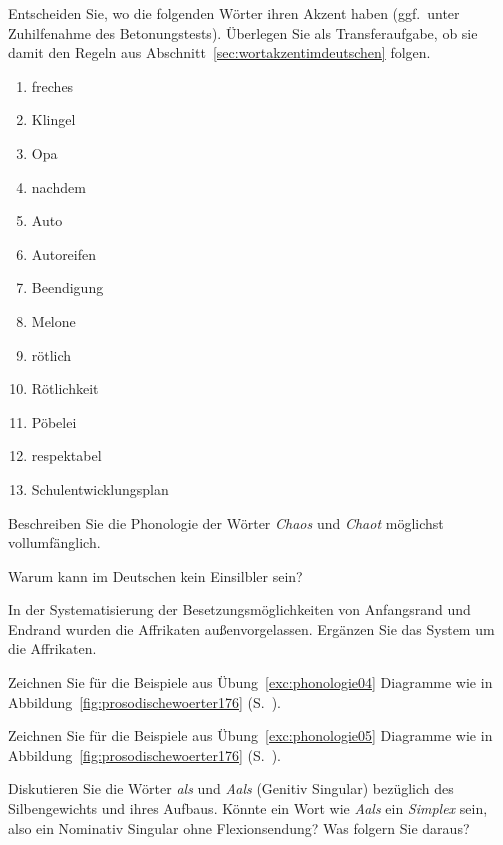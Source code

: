  \label{exc:phonologie05} Entscheiden Sie, wo die folgenden Wörter ihren Akzent haben (ggf.\ unter Zuhilfenahme des Betonungstests).
Überlegen Sie als Transferaufgabe, ob sie damit den Regeln aus Abschnitt~\ref{sec:wortakzentimdeutschen} folgen.

\begin{enumerate}
  \item freches
  \item Klingel
  \item Opa
  \item nachdem
  \item Auto
  \item Autoreifen
  \item Beendigung
  \item Melone
  \item rötlich
  \item Rötlichkeit
  \item Pöbelei
  \item respektabel
  \item Schulentwicklungsplan
\end{enumerate}

\Uebung[\tristar]{} \label{exc:phonologie06} Beschreiben Sie die Phonologie der Wörter \textit{Chaos} und \textit{Chaot} möglichst vollumfänglich.

 \label{exc:phonologie07} Warum kann \textipa{[s5]} im Deutschen kein Einsilbler sein?

\Uebung[\tristar]{} \label{exc:phonologie08} In der Systematisierung der Besetzungsmöglichkeiten von Anfangsrand und Endrand wurden die Affrikaten außenvorgelassen.
Ergänzen Sie das System um die Affrikaten.

\Uebung[\tristar]{} \label{exc:phonologie09} Zeichnen Sie für die Beispiele aus Übung~\ref{exc:phonologie04} Diagramme wie in Abbildung~\ref{fig:prosodischewoerter176} (S.~\pageref{fig:prosodischewoerter176}).

\Uebung[\tristar]{} \label{exc:phonologie10} Zeichnen Sie für die Beispiele aus Übung~\ref{exc:phonologie05} Diagramme wie in Abbildung~\ref{fig:prosodischewoerter176} (S.~\pageref{fig:prosodischewoerter176}).

\Uebung[\tristar]{} \label{exc:phonologie11} Diskutieren Sie die Wörter \textit{als} und \textit{Aals} (Genitiv Singular) bezüglich des Silbengewichts und ihres Aufbaus.
Könnte ein Wort wie \textit{Aals} ein \textit{Simplex} sein, also \zB ein Nominativ Singular ohne Flexionsendung?
Was folgern Sie daraus?

